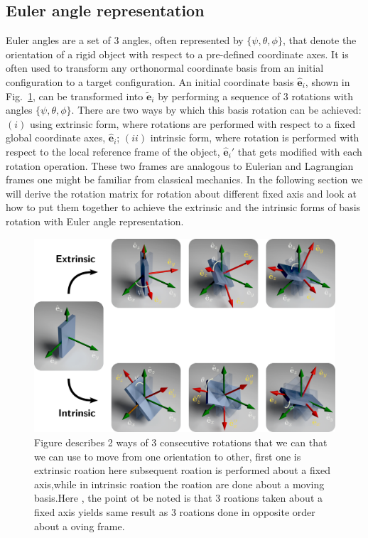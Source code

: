 \documentclass{article}
\def\eh{\hat{\mathbf{e}}}
\def\et{\tilde{\mathbf{e}}}
\begin{document}
\subsection{Euler angle representation}
Euler angles are a set of 3 angles, often represented by $\{\psi, \theta, \phi\}$, that denote the orientation of a rigid object with respect to a pre-defined coordinate axes. It is often used to transform any orthonormal coordinate basis from an initial configuration to a target configuration. An initial coordinate basis $\eh_i$, shown in Fig.~\ref{fig:eulAng3D}, can be transformed into $\et_i$ by performing a sequence of 3 rotations with angles $\{\psi, \theta, \phi\}$. There are two ways by which this basis rotation can be achieved: $(i)$ using extrinsic form, where rotations are performed with respect to a fixed global coordinate axes, $\eh_i$; $(ii)$ intrinsic form, where rotation is performed with respect to the local reference frame of the object, $\eh_i'$ that gets modified with each rotation operation. These two frames are analogous to Eulerian and Lagrangian frames one might be familiar from classical mechanics. In the following section we will derive the rotation matrix for rotation about different fixed axis and look at how to put them together to achieve the extrinsic and the intrinsic forms of basis rotation with Euler angle representation.

\begin{figure}[t!]
  \centering
  \includegraphics[width=\textwidth]{figs/figExtInt.png}
  \caption{Figure describes 2 ways of 3 consecutive rotations that we can that we can use to move from one orientation to other, first one is extrinsic roation here subsequent roation is performed about a fixed axis,while in intrinsic roation the roation are done about a moving basis.Here , the point ot be noted is that 3 roations taken about a fixed axis yields same result as 3 roations done in opposite order about a oving frame.}
  \label{fig:eulAng3D}
\end{figure}
\end{document}
